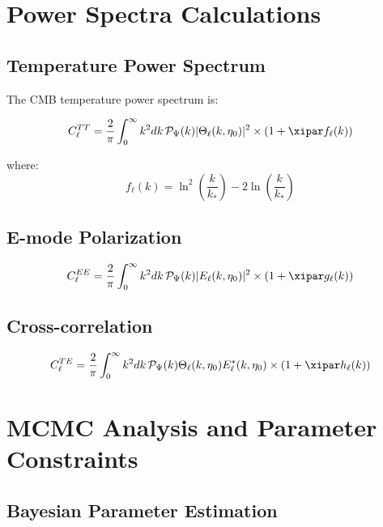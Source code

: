 	\section{Power Spectra Calculations}
	\label{sec:power_spectra}
	
	\subsection{Temperature Power Spectrum}
	
	The CMB temperature power spectrum is:
	
	\begin{equation}
		C_\ell^{TT} = \frac{2}{\pi}\int_0^\infty k^2 dk \, \mathcal{P}_\Psi(k) |\Theta_\ell(k,\eta_0)|^2 \times \left(1 + \xipar f_\ell(k)\right)
		\label{eq:cl_tt}
	\end{equation}
	
	where:
	\begin{equation}
		f_\ell(k) = \ln^2\left(\frac{k}{k_*}\right) - 2\ln\left(\frac{k}{k_*}\right)
	\end{equation}
	
	\subsection{E-mode Polarization}
	
	\begin{equation}
		C_\ell^{EE} = \frac{2}{\pi}\int_0^\infty k^2 dk \, \mathcal{P}_\Psi(k) |E_\ell(k,\eta_0)|^2 \times \left(1 + \xipar g_\ell(k)\right)
	\end{equation}
	
	\subsection{Cross-correlation}
	
	\begin{equation}
		C_\ell^{TE} = \frac{2}{\pi}\int_0^\infty k^2 dk \, \mathcal{P}_\Psi(k) \Theta_\ell(k,\eta_0) E_\ell^*(k,\eta_0) \times \left(1 + \xipar h_\ell(k)\right)
	\end{equation}
	
	\section{MCMC Analysis and Parameter Constraints}
	\label{sec:mcmc}
	
	\subsection{Bayesian Parameter Estimation}
	
